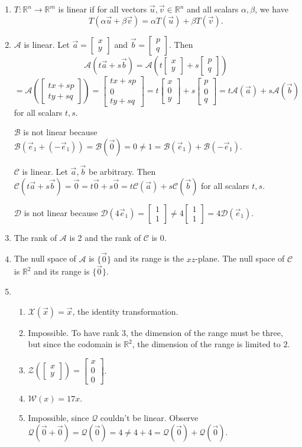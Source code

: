 \documentclass[red]{tutorial}
\newcommand{\R}{\mathbb{R}}
\newcommand{\mat}[1]{\begin{bmatrix}#1\end{bmatrix}}
\theoremstyle{definition}
\theoremstyle{theorem}
\begin{document}
	\begin{solutions}
		\begin{enumerate}
		\item $T:\R^n\to\R^m$ is linear if for all vectors $\vec u,\vec v\in \R^n$ and all
			scalars $\alpha,\beta$, we have
			\[
				T(\alpha\vec u+\beta\vec v)=\alpha T(\vec u)+\beta T(\vec v).
			\]
		\item $\mathcal A$ is linear. Let $\vec a=\mat{x\\y}$ and $\vec b=\mat{p\\q}$. Then
			\[
				\mathcal A(t\vec a+s\vec b) = 
				\mathcal A\left(t\mat{x\\y}+s\mat{p\\q}\right)\]\[=
				\mathcal A\left(\mat{tx+sp\\ty+sq}\right)=\mat{tx+sp\\0\\ty+sq}
				=t\mat{x\\0\\y}+s\mat{p\\0\\q}=t\mathcal A(\vec a)+s\mathcal A(\vec b)
			\]
			for all scalars $t,s$.
			
			$\mathcal B$ is not linear because $\mathcal B(\vec e_1+(-\vec e_1)) = \mathcal B(\vec 0)=0\neq
			1=\mathcal B(\vec e_1)+\mathcal B(-\vec e_1)$.

			$\mathcal C$ is linear. Let $\vec a,\vec b$ be arbitrary. Then $\mathcal C(t\vec a+s\vec b)=
			\vec 0=t\vec 0+s\vec 0=t\mathcal C(\vec a)+s\mathcal C(\vec b)$ for all scalars $t,s$.

			$\mathcal D$ is not linear because $\mathcal D(4\vec e_1) = \mat{1\\1}\neq 4\mat{1\\1} = 4\mathcal D(\vec e_1)$.

		\item The rank of $\mathcal A$ is 2  and the rank of $\mathcal C$ is 0.
		\item The null space of $\mathcal A$ is $\{\vec 0\}$ and its range is the $xz$-plane. The null space of $\mathcal C$ is
			$\R^2$ and its range is $\{\vec 0\}$.

		\item \begin{enumerate}
			\item $\mathcal X(\vec x)=\vec x$, the identity transformation.
			\item Impossible. To have rank $3$, the dimension of the range must be three, but since the codomain
				is $\R^2$, the dimension of the range is limited to $2$.
			\item $\mathcal Z(\mat{x\\y}) = \mat{x\\0\\0}$.
			\item $\mathcal W(x)=17x$.
			\item Impossible, since $\mathcal Q$ couldn't be linear. Observe $\mathcal Q(\vec 0+\vec 0)=
				\mathcal Q(\vec 0)=4\neq 4+4=\mathcal Q(\vec 0)+\mathcal Q(\vec 0)$.
		\end{enumerate}

		\end{enumerate}
	\end{solutions}
\end{document}
